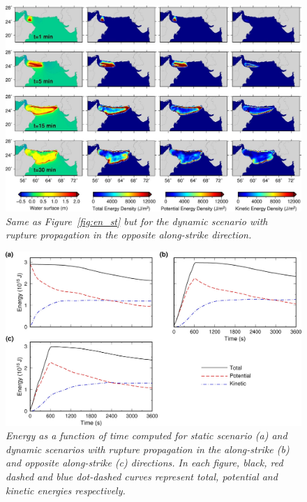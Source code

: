 \documentclass[12pt]{llncs}
\begin{document}
\begin{figure}
\centering
\includegraphics[scale=2.8]{Fig7.jpg}
\caption{\small\em Same as Figure~\ref{fig:en_st} but for the dynamic scenario with rupture propagation in the opposite along-strike direction.}
\label{fig:en_dy_lr}
\end{figure}

\begin{figure}
\centering
\includegraphics[scale=1.85]{Fig8.jpg}
\caption{\small\em Energy as a function of time computed for static scenario (a) and dynamic scenarios with rupture propagation in the along-strike (b) and opposite along-strike (c) directions. In each figure, black, red dashed and blue dot-dashed curves represent total, potential and kinetic energies respectively.}
\label{fig:en_t}
\end{figure}
\end{document}
